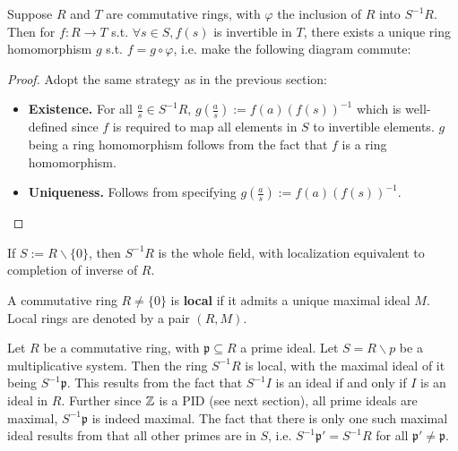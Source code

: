 \begin{theorem}
    Suppose $R$ and $T$ are commutative rings, with $\varphi$ the inclusion of $R$ into $S^{-1}R$. Then for $f: R\to T$ s.t. $\forall s\in S, f(s)$ is invertible in $T$, there exists a unique ring homomorphism $g$ s.t. $f = g\circ \varphi$, i.e. make the following diagram commute:
    
    \begin{minipage}{\linewidth}
        \centering    
    \end{minipage}
\end{theorem}

\begin{proof}
    Adopt the same strategy as in the previous section: 
    \begin{itemize}
        \item \textbf{Existence.} For all $\frac{a}{s}\in S^{-1}R$, $g(\frac{a}{s}) := f(a) (f(s))^{-1}$ which is well-defined since $f$ is required to map all elements in $S$ to invertible elements. $g$ being a ring homomorphism follows from the fact that $f$ is a ring homomorphism. 
        \item \textbf{Uniqueness.} Follows from specifying $g(\frac{a}{s}) := f(a) (f(s))^{-1}$.
    \end{itemize}
\end{proof}

\begin{remark}
    If $S := R\smallsetminus\{0\}$, then $S^{-1}R$ is the whole field, with localization equivalent to completion of inverse of $R$.
\end{remark}

\begin{definition}
    A commutative ring $R\neq \{0\}$ is \textbf{local} if it admits a unique maximal ideal $M$. Local rings are denoted by a pair $(R, M)$.
\end{definition}

\begin{example}
    Let $R$ be a commutative ring, with $\mathfrak{p} \subseteq R$ a prime ideal. Let $S = R\smallsetminus p$ be a multiplicative system. Then the ring $S^{-1}R$ is local, with the maximal ideal of it being $S^{-1}\mathfrak{p}$. This results from the fact that $S^{-1}I$ is an ideal if and only if $I$ is an ideal in $R$. Further since $\mathbb{Z}$ is a PID (see next section), all prime ideals are maximal, $S^{-1}\mathfrak{p}$ is indeed maximal. The fact that there is only one such maximal ideal results from that all other primes are in $S$, i.e. $S^{-1}\mathfrak{p}'=S^{-1}R$ for all $\mathfrak{p}' \neq \mathfrak{p}$. 
\end{example}

